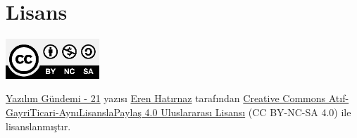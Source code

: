\documentclass[11pt]{article}
\begin{document}
\section{Lisans}
\label{sec:org5569449}
\begin{center}
\begin{center}
\includegraphics[height=1.5cm]{../../../img/CC_BY-NC-SA_4.0.png}
\end{center}

\href{yazilim-gundemi-21.pdf}{Yazılım Gündemi - 21} yazısı \href{https://erenhatirnaz.github.io}{Eren Hatırnaz} tarafından \href{http://creativecommons.org/licenses/by-nc-sa/4.0/}{Creative Commons
Atıf-GayriTicari-AynıLisanslaPaylaş 4.0 Uluslararası Lisansı} (CC BY-NC-SA 4.0)
ile lisanslanmıştır.
\end{center}
\end{document}
